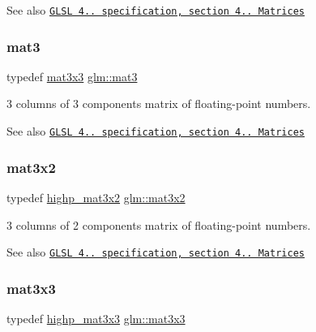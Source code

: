 \begin{DoxySeeAlso}{See also}
\href{http://www.opengl.org/registry/doc/GLSLangSpec.4.20.8.pdf}{\tt G\+L\+SL 4.. specification, section 4.. Matrices} 
\end{DoxySeeAlso}
\mbox{\label{group__core__types_gadfaff2a7dce5cbf4e77a47ecea42ac5b}} 
\subsubsection{\texorpdfstring{mat3}{mat3}}
{\footnotesize\ttfamily typedef \mbox{\hyperlink{group__core__types_ga6fecca6a869070b6bf8acb44ce1c2af3}{mat3x3}} \mbox{\hyperlink{group__core__types_gadfaff2a7dce5cbf4e77a47ecea42ac5b}{glm\+::mat3}}}

3 columns of 3 components matrix of floating-\/point numbers.

\begin{DoxySeeAlso}{See also}
\href{http://www.opengl.org/registry/doc/GLSLangSpec.4.20.8.pdf}{\tt G\+L\+SL 4.. specification, section 4.. Matrices} 
\end{DoxySeeAlso}
\mbox{\label{group__core__types_gad7476e0e866186f12ee87975c6b01552}} 
\subsubsection{\texorpdfstring{mat3x2}{mat3x2}}
{\footnotesize\ttfamily typedef \mbox{\hyperlink{group__core__precision_ga2188c0b772ac9d6210d46af34e04f375}{highp\+\_\+mat3x2}} \mbox{\hyperlink{group__core__types_gad7476e0e866186f12ee87975c6b01552}{glm\+::mat3x2}}}

3 columns of 2 components matrix of floating-\/point numbers.

\begin{DoxySeeAlso}{See also}
\href{http://www.opengl.org/registry/doc/GLSLangSpec.4.20.8.pdf}{\tt G\+L\+SL 4.. specification, section 4.. Matrices} 
\end{DoxySeeAlso}
\mbox{\label{group__core__types_ga6fecca6a869070b6bf8acb44ce1c2af3}} 
\subsubsection{\texorpdfstring{mat3x3}{mat3x3}}
{\footnotesize\ttfamily typedef \mbox{\hyperlink{group__core__precision_ga83105b0c326393a133a43c426aae2a9c}{highp\+\_\+mat3x3}} \mbox{\hyperlink{group__core__types_ga6fecca6a869070b6bf8acb44ce1c2af3}{glm\+::mat3x3}}}

